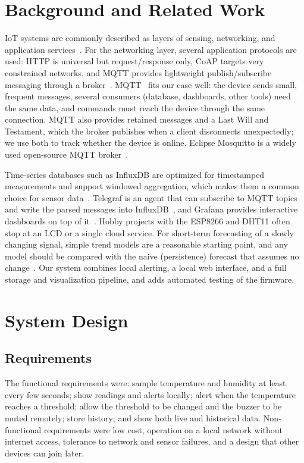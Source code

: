 \documentclass[conference]{IEEEtran}
\begin{document}
\section{Background and Related Work}

IoT systems are commonly described as layers of sensing, networking, and
application services~\cite{alfuqaha}. For the networking layer, several application
protocols are used: HTTP is universal but request/response only, CoAP targets very
constrained networks, and MQTT provides lightweight publish/subscribe messaging through
a broker~\cite{naik}. MQTT~\cite{mqtt311} fits our case well: the device sends small,
frequent messages, several consumers (database, dashboards, other tools) need the same
data, and commands must reach the device through the same connection. MQTT also
provides retained messages and a Last Will and Testament, which the broker publishes
when a client disconnects unexpectedly; we use both to track whether the device is
online. Eclipse Mosquitto is a widely used open-source MQTT broker~\cite{mosquitto}.

Time-series databases such as InfluxDB are optimized for timestamped measurements
and support windowed aggregation, which makes them a common choice for sensor
data~\cite{influxdb}. Telegraf is an agent that can subscribe to MQTT topics and write
the parsed messages into InfluxDB~\cite{telegraf}, and Grafana provides interactive
dashboards on top of it~\cite{grafana}. Hobby projects with the ESP8266 and DHT11 often
stop at an LCD or a single cloud service. For short-term forecasting of a slowly
changing signal, simple trend models are a reasonable starting point, and any model
should be compared with the naive (persistence) forecast that assumes no
change~\cite{hyndman}. Our system combines local alerting, a local
web interface, and a full storage and visualization pipeline, and adds automated
testing of the firmware.

\section{System Design}

\subsection{Requirements}
The functional requirements were: sample temperature and humidity at least every few
seconds; show readings and alerts locally; alert when the temperature reaches a
threshold; allow the threshold to be changed and the buzzer to be muted remotely; store
history; and show both live and historical data. Non-functional requirements were low
cost, operation on a local network without internet access, tolerance to network and
sensor failures, and a design that other devices can join later.
\end{document}
